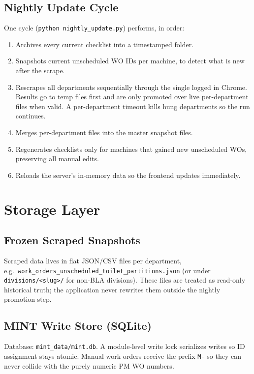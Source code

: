 \documentclass[11pt,a4paper]{article}
\newcommand{\code}[1]{\texttt{#1}}
\begin{document}
\subsection{Nightly Update Cycle}
One cycle (\code{python nightly\_update.py}) performs, in order:
\begin{enumerate}
    \item Archives every current checklist into a timestamped folder.
    \item Snapshots current unscheduled WO IDs per machine, to detect what
          is new after the scrape.
    \item Rescrapes all departments sequentially through the single logged
          in Chrome. Results go to temp files first and are only promoted
          over live per-department files when valid. A per-department
          timeout kills hung departments so the run continues.
    \item Merges per-department files into the master snapshot files.
    \item Regenerates checklists only for machines that gained new
          unscheduled WOs, preserving all manual edits.
    \item Reloads the server's in-memory data so the frontend updates
          immediately.
\end{enumerate}

\section{Storage Layer}

\subsection{Frozen Scraped Snapshots}
Scraped data lives in flat JSON/CSV files per department, e.g.\
\code{work\_orders\_unscheduled\_toilet\_partitions.json} (or under
\code{divisions/<slug>/} for non-BLA divisions). These files are treated as
read-only historical truth; the application never rewrites them outside the
nightly promotion step.

\subsection{MINT Write Store (SQLite)}
\label{sec:store}
Database: \code{mint\_data/mint.db}. A module-level write lock serializes
writes so ID assignment stays atomic. Manual work orders receive the prefix
\code{M-} so they can never collide with the purely numeric PM WO numbers.
\end{document}

